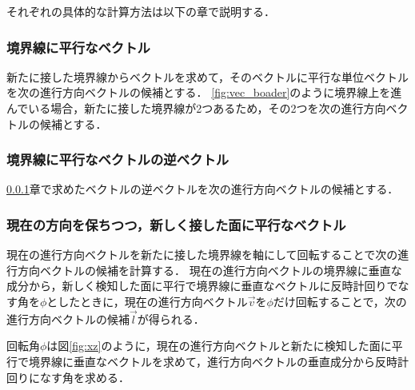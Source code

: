 \documentclass[a4paper,11pt]{jarticle}
\begin{document}
	それぞれの具体的な計算方法は以下の章で説明する．
	\subsubsection{境界線に平行なベクトル}
	\label{boader}
	新たに接した境界線からベクトルを求めて，そのベクトルに平行な単位ベクトルを次の進行方向ベクトルの候補とする．
	\ref{fig:vec_boader}のように境界線上を進んでいる場合，新たに接した境界線が2つあるため，その2つを次の進行方向ベクトルの候補とする．
	
	\subsubsection{境界線に平行なベクトルの逆ベクトル}
	\ref{boader}章で求めたベクトルの逆ベクトルを次の進行方向ベクトルの候補とする．
	
	\subsubsection{現在の方向を保ちつつ，新しく接した面に平行なベクトル}
	\label{rotation}
	現在の進行方向ベクトルを新たに接した境界線を軸にして回転することで次の進行方向ベクトルの候補を計算する．
	現在の進行方向ベクトルの境界線に垂直な成分から，新しく検知した面に平行で境界線に垂直なベクトルに反時計回りでなす角を$ \phi $としたときに，現在の進行方向ベクトル$\vec{v}$を$\phi$だけ回転することで，次の進行方向ベクトルの候補$\vec{l}$が得られる．
	
	回転角$\phi$は図\ref{fig:xz}のように，現在の進行方向ベクトルと新たに検知した面に平行で境界線に垂直なベクトルを求めて，進行方向ベクトルの垂直成分から反時計回りになす角を求める．
	
\end{document}
